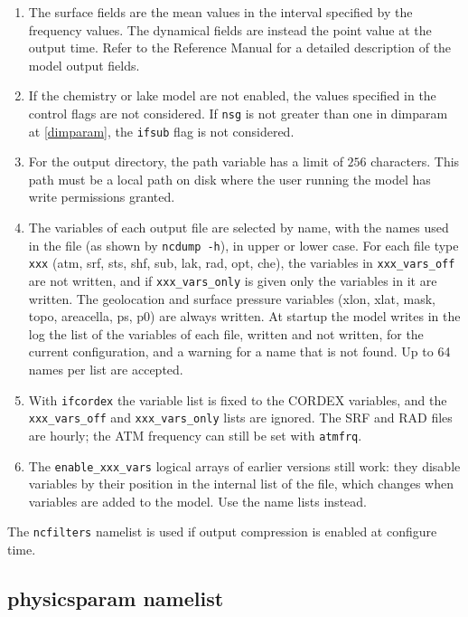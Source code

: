 \begin{enumerate}
\item The surface fields are the mean values in the interval specified by
the frequency values. The dynamical fields are instead the point value at the
output time. Refer to the Reference Manual \cite{refman_11} for a detailed
description of the model output fields.
\item If the chemistry or lake model are not enabled, the values specified in
the control flags are not considered. If \verb=nsg= is not greater than one
in dimparam at \ref{dimparam}, the \verb=ifsub= flag is not considered.
\item For the output directory, the path variable has a limit of $256$
characters. This path must be a local path on disk where the user running
the model has write permissions granted.
\item The variables of each output file are selected by name, with the
names used in the file (as shown by \verb=ncdump -h=), in upper or lower
case. For each file type \verb=xxx= (atm, srf, sts, shf, sub, lak, rad, opt,
che), the variables in \verb=xxx_vars_off= are not written, and if
\verb=xxx_vars_only= is given only the variables in it are written. The
geolocation and surface pressure variables (xlon, xlat, mask, topo,
areacella, ps, p0) are always written. At startup the model writes in the
log the list of the variables of each file, written and not written, for
the current configuration, and a warning for a name that is not found.
Up to 64 names per list are accepted.
\item With \verb=ifcordex= the variable list is fixed to the CORDEX
variables, and the \verb=xxx_vars_off= and \verb=xxx_vars_only= lists are
ignored. The SRF and RAD files are hourly; the ATM frequency can still be
set with \verb=atmfrq=.
\item The \verb=enable_xxx_vars= logical arrays of earlier versions still
work: they disable variables by their position in the internal list of the
file, which changes when variables are added to the model. Use the name
lists instead.
\end{enumerate}

The \verb=ncfilters= namelist is used if output compression is enabled at
configure time.

\subsection{physicsparam namelist}
\label{physicsparam}

